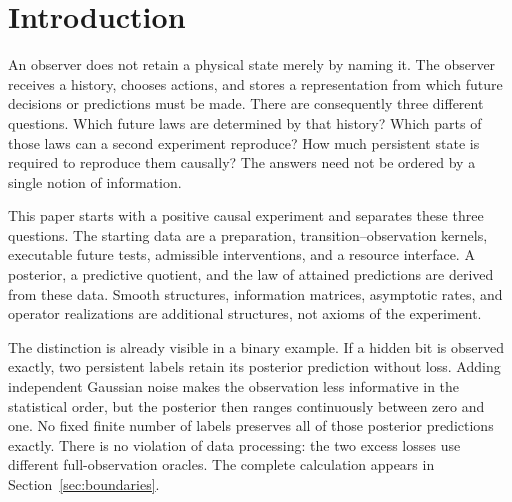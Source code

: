 \section{Introduction}
An observer does not retain a physical state merely by naming it. The observer
receives a history, chooses actions, and stores a representation from which
future decisions or predictions must be made. There are consequently three
different questions. Which future laws are determined by that history? Which
parts of those laws can a second experiment reproduce? How much persistent
state is required to reproduce them causally? The answers need not be ordered
by a single notion of information.

This paper starts with a positive causal experiment and separates these three
questions. The starting data are a preparation, transition--observation
kernels, executable future tests, admissible interventions, and a resource
interface. A posterior, a predictive quotient, and the law of attained
predictions are derived from these data. Smooth structures, information
matrices, asymptotic rates, and operator realizations are additional
structures, not axioms of the experiment.

The distinction is already visible in a binary example. If a hidden bit is
observed exactly, two persistent labels retain its posterior prediction
without loss. Adding independent Gaussian noise makes the observation less
informative in the statistical order, but the posterior then ranges
continuously between zero and one. No fixed finite number of labels preserves
all of those posterior predictions exactly. There is no violation of data
processing: the two excess losses use different full-observation oracles.
The complete calculation appears in Section~\ref{sec:boundaries}.

